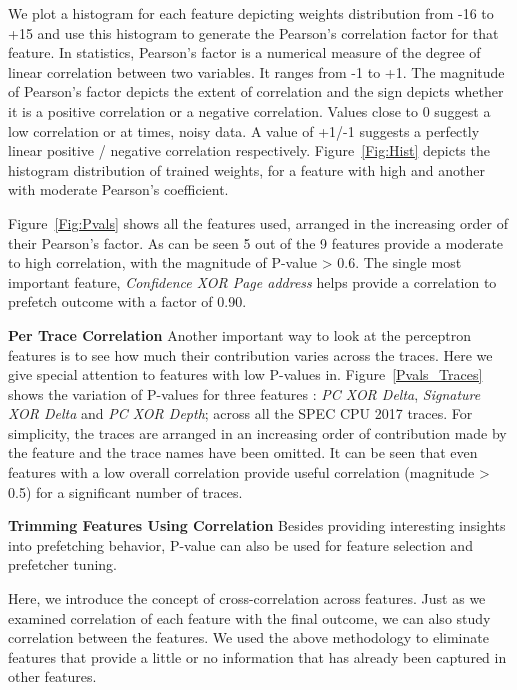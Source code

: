 We plot a histogram for each feature depicting weights distribution
from -16 to +15 and use this histogram to generate the Pearson's
correlation factor for that feature.  In statistics, Pearson's factor
is a numerical measure of the degree of linear correlation between two
variables.  It ranges from -1 to +1.  The magnitude of Pearson's
factor depicts the extent of correlation and the sign depicts whether
it is a positive correlation or a negative correlation.  Values close
to 0 suggest a low correlation or at times, noisy data.  A value of
+1/-1 suggests a perfectly linear positive / negative correlation
respectively.  Figure~\ref{Fig:Hist} depicts the histogram distribution 
of trained weights, for a feature with high and another with moderate
Pearson's coefficient.

Figure~\ref{Fig:Pvals} shows all the features used, arranged in the increasing
order of their Pearson's factor.  As can be seen 5 out of the 9
features provide a moderate to high correlation, with the magnitude of
P-value > 0.6.  The single most important feature, 
\textit{Confidence XOR Page address} helps provide
a correlation to prefetch outcome with a factor of 0.90.

\textbf{Per Trace Correlation} \newline Another important way to look
at the perceptron features is to see how much their contribution
varies across the traces.  Here we give special attention to features
with low P-values in.  Figure~\ref{Pvals_Traces} shows the
variation of P-values for three features : \textit{PC XOR Delta},
\textit{Signature XOR Delta} and 
\textit{PC XOR Depth}; across all the SPEC CPU 2017 traces.  
For simplicity, the traces are arranged in an
increasing order of contribution made by the feature and the trace
names have been omitted.  It can be seen that even features with a low
overall correlation provide useful correlation (magnitude > 0.5) for
a significant number of traces.

\textbf{Trimming Features Using Correlation} \newline Besides
providing interesting insights into prefetching behavior, P-value can
also be used for feature selection and prefetcher tuning.

Here, we introduce the concept of cross-correlation across features.
Just as we examined correlation of each feature with the final
outcome, we can also study correlation between the features.  We used
the above methodology to eliminate features that provide a little or
no information that has already been captured in other features.


